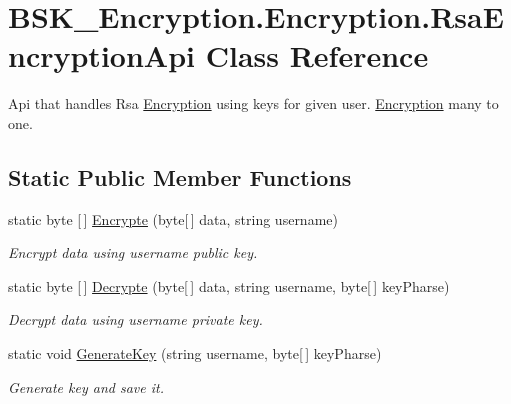 \hypertarget{class_b_s_k___encryption_1_1_encryption_1_1_rsa_encryption_api}{}\section{B\+S\+K\+\_\+\+Encryption.\+Encryption.\+Rsa\+Encryption\+Api Class Reference}
\label{class_b_s_k___encryption_1_1_encryption_1_1_rsa_encryption_api}


Api that handles Rsa \mbox{\hyperlink{namespace_b_s_k___encryption_1_1_encryption}{Encryption}} using keys for given user. \mbox{\hyperlink{namespace_b_s_k___encryption_1_1_encryption}{Encryption}} many to one.  


\subsection*{Static Public Member Functions}
\begin{DoxyCompactItemize}
\item 
static byte \mbox{[}$\,$\mbox{]} \mbox{\hyperlink{class_b_s_k___encryption_1_1_encryption_1_1_rsa_encryption_api_a60bd2ada99112276d7b50b6096269187}{Encrypte}} (byte\mbox{[}$\,$\mbox{]} data, string username)
\begin{DoxyCompactList}\small\item\em Encrypt data using username public key. \end{DoxyCompactList}\item 
static byte \mbox{[}$\,$\mbox{]} \mbox{\hyperlink{class_b_s_k___encryption_1_1_encryption_1_1_rsa_encryption_api_ab085345c3144ba43e1dba49795f7faeb}{Decrypte}} (byte\mbox{[}$\,$\mbox{]} data, string username, byte\mbox{[}$\,$\mbox{]} key\+Pharse)
\begin{DoxyCompactList}\small\item\em Decrypt data using username private key. \end{DoxyCompactList}\item 
static void \mbox{\hyperlink{class_b_s_k___encryption_1_1_encryption_1_1_rsa_encryption_api_a9487324e4e7f5f3e112f4fcd56551102}{Generate\+Key}} (string username, byte\mbox{[}$\,$\mbox{]} key\+Pharse)
\begin{DoxyCompactList}\small\item\em Generate key and save it. \end{DoxyCompactList}\end{DoxyCompactItemize}


